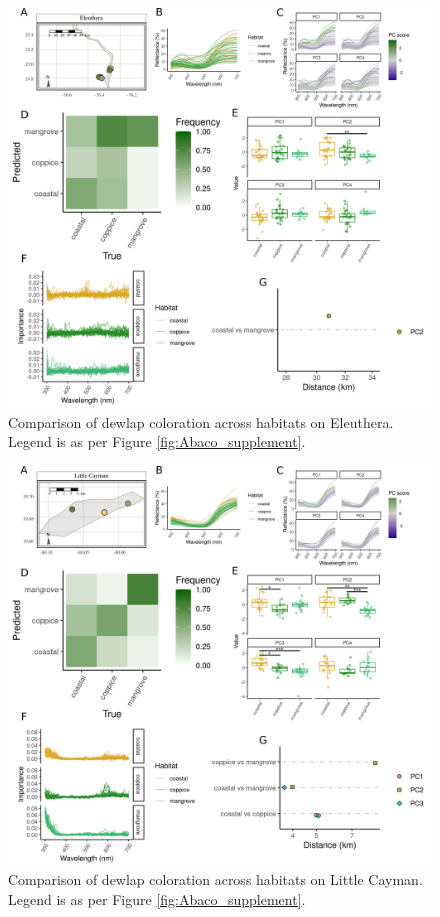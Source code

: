 \begin{figure}[H]
	\centering
	\includegraphics[width=\textwidth]{figures/Eleuthera_supplement.png}
	\caption{Comparison of dewlap coloration across habitats on Eleuthera. Legend is as per Figure \ref{fig:Abaco_supplement}.}
	\label{fig:Eleuthera}
\end{figure}

\begin{figure}[H]
	\centering
	\includegraphics[width=\textwidth]{figures/LittleCayman_supplement.png}
	\caption{Comparison of dewlap coloration across habitats on Little Cayman. Legend is as per Figure \ref{fig:Abaco_supplement}.}
	\label{fig:LittleCayman}
\end{figure}

